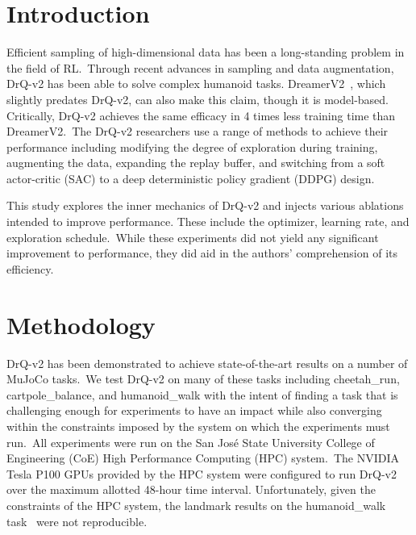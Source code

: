\documentclass[conference]{./IEEEtran/IEEEtran} %
\begin{document}
    \section{Introduction}\label{sec:introduction}
    Efficient sampling of high-dimensional data has been a long-standing problem in the field of RL.\ Through recent
    advances in sampling and data augmentation, DrQ-v2 has been able to solve complex humanoid tasks.
    DreamerV2~\cite{DreamerV2}, which slightly predates DrQ-v2, can also make this claim, though it is model-based.
    Critically, DrQ-v2 achieves the same efficacy in 4 times less training time than DreamerV2.\ The DrQ-v2 researchers
    use a range of methods to achieve their performance including modifying the degree of exploration during training,
    augmenting the data, expanding the replay buffer, and switching from a soft actor-critic (SAC) to a deep
    deterministic policy gradient (DDPG) design.


    This study explores the inner mechanics of DrQ-v2 and injects various ablations intended to improve performance.
    These include the optimizer, learning rate, and exploration schedule.\ While these experiments did not yield any
    significant improvement to performance, they did aid in the authors' comprehension of its efficiency.

    \section{Methodology}\label{sec:methodology}
    DrQ-v2 has been demonstrated to achieve state-of-the-art results on a number of MuJoCo tasks.\ We test DrQ-v2 on
    many of these tasks including cheetah\_run, cartpole\_balance, and humanoid\_walk with the intent of finding a
    task that is challenging enough for experiments to have an impact while also converging within the constraints
    imposed by the system on which the experiments must run.\ All experiments were run on the San Jos\'e State
    University College of Engineering (CoE) High Performance Computing (HPC) system.\ The NVIDIA Tesla P100 GPUs
    provided by the HPC system were configured to run DrQ-v2 over the maximum allotted 48-hour time interval.
    Unfortunately, given the constraints of the HPC system, the landmark results on the humanoid\_walk task~\cite{DrQv2}
    were not reproducible.
\end{document}
